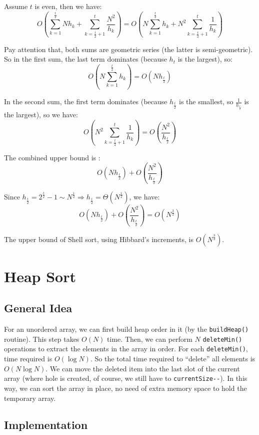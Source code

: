 \documentclass[11pt]{book}
\begin{document}
Assume \(t\) is even, then we have:
\[
O(\sum_{k = 1}^{\frac {t} {2}}Nh_k + \sum_{k = \frac {t} {2} + 1}^{t}\frac {N^2} {h_k}) = O(N\sum_{k = 1}^{\frac {t} {2}}h_k + N^2\sum_{k = \frac {t} {2} + 1}^{t}\frac {1} {h_k})
\]

Pay attention that, both sums are geometric series (the latter is semi-geometric). So in the first sum, the last term dominates (because \(h_t\) is the largest), so:
\[
O(N\sum_{k = 1}^{\frac {t} {2}}h_k) = O(Nh_{\frac {t} {2}})
\]

In the second sum, the first term dominates (because \(h_{\frac {t} {2}}\) is the smallest, so \(\frac {1} {h_{\frac {t} {2}}}\) is the largest), so we have:
\[
O(N^2\sum_{k = \frac {t} {2} + 1}^{t}\frac {1} {h_k}) = O(\frac {N^2} {h_{\frac {t} {2}}})
\]

The combined upper bound is :
\[
O(Nh_{\frac {t} {2}}) + O(\frac {N^2} {h_{\frac {t} {2}}})
\]

Since \(h_{\frac {t} {2}} = 2^{\frac {t} {2}} - 1 \sim N^{\frac {1} {2}} \Rightarrow h_{\frac {t} {2}} = \Theta (N^{\frac {1} {2}})\), we have:
\[
O(Nh_{\frac {t} {2}}) + O(\frac {N^2} {h_{\frac {t} {2}}}) = O(N^{\frac {3} {2}})
\]

The upper bound of Shell sort, using Hibbard's increments, is \(O(N^{\frac {3} {2}})\).

\chapter{Heap Sort}
\label{sec:orge109f0a}
\section{General Idea}
\label{sec:orgacf93c9}
For an unordered array, we can first build heap order in it (by the \texttt{buildHeap()} routine). This step takes \(O(N)\) time. Then, we can perform \(N\) \texttt{deleteMin()} operations to extract the elements in the array in order. For each \texttt{deleteMin()}, time required is \(O(\log{N})\). So the total time required to ``delete'' all elements is \(O(N\log{N})\). We can move the deleted item into the last slot of the current array (where hole is created, of course, we still have to \texttt{currentSize-{}-}). In this way, we can sort the array in place, no need of extra memory space to hold the temporary array.
\section{Implementation}
\label{sec:org82d69d5}
\end{document}
